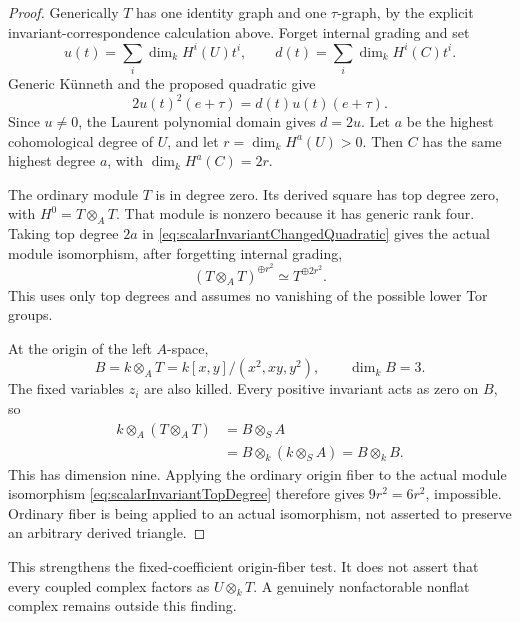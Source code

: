 \documentclass[11pt,a4paper]{article}
\theoremstyle{named}\newtheorem{finding}{Finding}[section]
\theoremstyle{definition}\newtheorem{definition}[finding]{Definition}
\theoremstyle{remark}\newtheorem{remark}[finding]{Remark}
\begin{document}
\begin{proof}
Generically \(T\) has one identity graph and one
\(\tau\)-graph, by the explicit invariant-correspondence
calculation above. Forget internal grading and set
\[
 u(t)=\sum_i\dim_kH^i(U)t^i,\qquad
 d(t)=\sum_i\dim_kH^i(C)t^i.
\]
Generic K\"unneth and the proposed quadratic give
\[
             2u(t)^2(e+\tau)=d(t)u(t)(e+\tau).
\]
Since \(u\ne0\), the Laurent polynomial domain gives
\(d=2u\). Let \(a\) be the highest cohomological degree
of \(U\), and let \(r=\dim_kH^a(U)>0\).
Then \(C\) has the same highest degree \(a\), with
\(\dim_kH^a(C)=2r\).

The ordinary module \(T\) is in degree zero. Its derived
square has top degree zero, with \(H^0=T\otimes_AT\).
That module is nonzero because it has generic rank four.
Taking top degree \(2a\) in
\eqref{eq:scalarInvariantChangedQuadratic} gives the
actual module isomorphism, after forgetting internal grading,
\begin{equation}\label{eq:scalarInvariantTopDegree}
             (T\otimes_AT)^{\oplus r^2}
                         \simeq T^{\oplus2r^2}.
\end{equation}
This uses only top degrees and assumes no vanishing of
the possible lower Tor groups.

At the origin of the left \(A\)-space,
\[
 B=k\otimes_AT
   =k[x,y]/(x^2,xy,y^2),\qquad \dim_kB=3.
\]
The fixed variables \(z_i\) are also killed. Every
positive invariant acts as zero on \(B\), so
\[
 \begin{aligned}
 k\otimes_A(T\otimes_AT)
   &=B\otimes_SA\\
   &=B\otimes_k(k\otimes_SA)
     =B\otimes_kB.
 \end{aligned}
\]
This has dimension nine. Applying the ordinary origin
fiber to the actual module isomorphism
\eqref{eq:scalarInvariantTopDegree} therefore gives
\(9r^2=6r^2\), impossible.
Ordinary fiber is being applied to an actual isomorphism,
not asserted to preserve an arbitrary derived triangle.
\end{proof}

This strengthens the fixed-coefficient origin-fiber test.
It does not assert that every coupled complex factors
as \(U\otimes_kT\). A genuinely nonfactorable nonflat
complex remains outside this finding.
\end{document}
